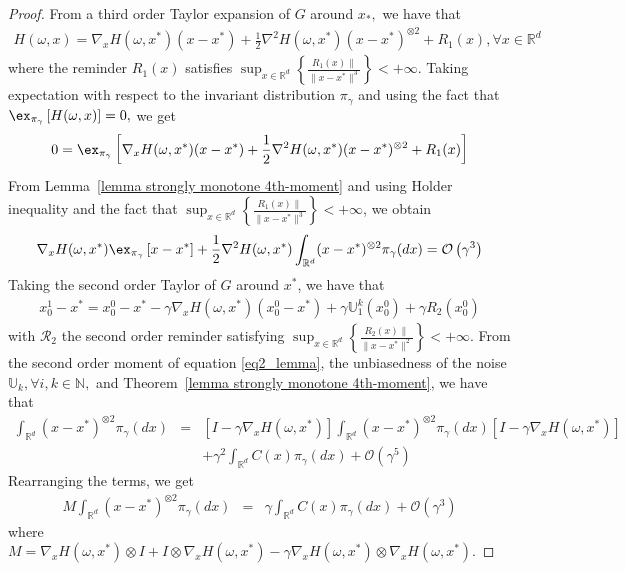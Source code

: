 \begin{proof}
    From a third order Taylor expansion of $G$ around $x_*,$ we have that
    \begin{eqnarray}
        H(\omega,x) = \nabla_{x} H(\omega,x^*) (x - x^*) + \frac{1}{2} \nabla^2 H(\omega,x^*) (x - x^*)^{\otimes2} + R_1(x), \forall x \in \mathbb{R}^d 
    \end{eqnarray}
    where the reminder $R_1(x)$ satisfies $\sup_{x\in\mathbb{R}^d}\left\{\frac{R_1(x)\|}{\|x - x^*\|^3}\right\} < +\infty$.
    Taking expectation with respect to the invariant distribution $\pi_\gamma$ and using the fact that $\ex_{\pi_{\gamma}}\left[H(\omega,x)\right] = 0,$ we get 
    \begin{eqnarray}
        0 = \ex_{\pi_{\gamma}}\left[\nabla_{x} H(\omega,x^*) (x - x^*) + \frac{1}{2} \nabla^2 H(\omega,x^*) (x - x^*)^{\otimes2} + R_1(x)\right] 
    \end{eqnarray}
    From Lemma~\ref{lemma strongly monotone 4th-moment} and using Holder inequality and the fact that $\sup_{x\in\mathbb{R}^d}\left\{\frac{R_1(x)\|}{\|x - x^*\|^3}\right\} < +\infty$, we obtain
    \begin{eqnarray}
        \nabla_{x} H(\omega,x^*)\Expepgamma{x - x^*} + \frac{1}{2} \nabla^2 H(\omega,x^*)\int_{\mathbb{R}^d} (x - x^*)^{\otimes2}\pi_\gamma(dx) = \mathcal{O}\left(\gamma^3\right) \label{eq1_lemma}
    \end{eqnarray}
    Taking the second order Taylor of $G$ around $x^*$, we have that 
    \begin{eqnarray}
        x^1_0 - x^* = x_0^0 - x^* - \gamma \nabla_{x} H(\omega,x^*)(x_0^0 - x^*) + \gamma \mathbb{U}_1^k(x_0^0)+\gamma R_2(x^0_0) \label{eq2_lemma}
    \end{eqnarray}
    with $\mathcal{R}_2$ the second order reminder satisfying $\sup_{x\in\mathbb{R}^d}\left\{\frac{R_2(x)\|}{\|x - x^*\|^2}\right\} < +\infty$. 
    From the second order moment of equation \eqref{eq2_lemma}, the unbiasedness of the noise $\mathbb{U}_k, \forall i, k \in \mathbb{N},$ and Theorem~\ref{lemma strongly monotone 4th-moment}, we have that
    \begin{eqnarray}
        \int_{\mathbb{R}^d} (x - x^*)^{\otimes2} \pi_\gamma(dx) &=& \left[I - \gamma \nabla_{x} H(\omega,x^*)\right] \int_{\mathbb{R}^d}(x - x^*)^{\otimes 2}\pi_\gamma(dx) \left[I - \gamma \nabla_{x} H(\omega,x^*)\right] \nonumber \\
        && + \gamma^2 \int_{\mathbb{R}^d} C(x) \pi_\gamma(dx) + \mathcal{O}\left(\gamma^5\right)\nonumber
    \end{eqnarray}
    Rearranging the terms, we get
    \begin{eqnarray}
        M \int_{\mathbb{R}^d} (x - x^*)^{\otimes2} \pi_\gamma(dx) &=& \gamma \int_{\mathbb{R}^d} C(x) \pi_\gamma(dx) + \mathcal{O}\left(\gamma^3\right) \label{eq3_lemma}
    \end{eqnarray}
    where $M = \nabla_{x} H(\omega,x^*)\otimes I + I \otimes \nabla_{x} H(\omega,x^*)-\gamma \nabla_{x} H(\omega,x^*)\otimes \nabla_{x} H(\omega,x^*)$.
    

\end{proof}
